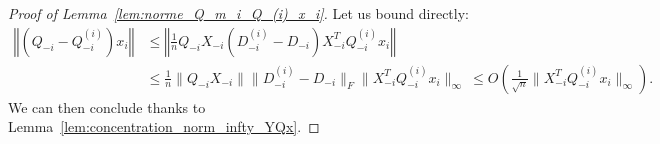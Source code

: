 \documentclass[a4papaer, titlepage]{book}
\begin{document}
 \begin{proof}[Proof of Lemma~\ref{lem:norme_Q_m_i_Q_(i)_x_i}]
 Let us bound directly:
   \begin{align*}
    \left\Vert \left(Q_{-i} - Q_{-i}^{(i)}\right) x_i\right\Vert
    &\leq  \left\Vert \frac{1}{n}  Q_{-i} X_{-i} (D_{-i}^{(i)} - D_{-i})  X_{-i}^T Q_{-i}^{(i)} x_i \right\Vert\\
    &\leq \frac{1}{n} \| Q_{-i} X_{-i}\| \|D_{-i}^{(i)} - D_{-i}\|_F \|  X_{-i}^T Q_{-i}^{(i)} x_i \|_\infty 
    \ \leq O \left(\frac{1}{\sqrt n} \|  X_{-i}^T Q_{-i}^{(i)} x_i \|_\infty \right).
\end{align*}
We can then conclude thanks to Lemma~\ref{lem:concentration_norm_infty_YQx}.
 \end{proof}
 
\end{document}
